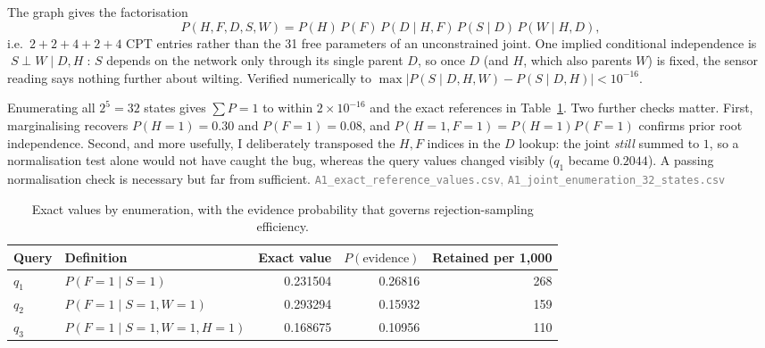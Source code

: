 \documentclass[10pt,a4paper]{article}
\begin{document}
\begin{minipage}[t]{0.30\textwidth}
\vspace{2pt}
\centering
{}
\end{minipage}%
\begin{minipage}[t]{0.68\textwidth}
\vspace{4pt}
The graph gives the factorisation
\[
P(H,F,D,S,W)=P(H)\,P(F)\,P(D\mid H,F)\,P(S\mid D)\,P(W\mid H,D),
\]
i.e.\ $2{+}2{+}4{+}2{+}4$ CPT entries rather than the 31 free parameters of an unconstrained joint.
One implied conditional independence is $\;S \perp W \mid D,H\;$: $S$ depends on the network only
through its single parent $D$, so once $D$ (and $H$, which also parents $W$) is fixed, the sensor
reading says nothing further about wilting. Verified numerically to
$\max|P(S\mid D,H,W)-P(S\mid D,H)| < 10^{-16}$.
\end{minipage}

\smallskip
Enumerating all $2^5=32$ states gives $\sum P = 1$ to within $2\times10^{-16}$ and the exact
references in Table~\ref{tab:Aexact}. Two further checks matter. First, marginalising recovers
$P(H{=}1)=0.30$ and $P(F{=}1)=0.08$, and $P(H{=}1,F{=}1)=P(H{=}1)P(F{=}1)$ confirms prior root
independence. Second, and more usefully, I deliberately transposed the $H,F$ indices in the $D$
lookup: the joint \emph{still} summed to $1$, so a normalisation test alone would not have caught
the bug, whereas the query values changed visibly ($q_1$ became $0.2044$). A passing normalisation
check is necessary but far from sufficient.
\textcolor{gray}{\small\texttt{A1\_exact\_reference\_values.csv}, \texttt{A1\_joint\_enumeration\_32\_states.csv}}

\begin{table}[H]\centering\small
\caption{Exact values by enumeration, with the evidence probability that governs rejection-sampling efficiency.}
\label{tab:Aexact}
\begin{tabular}{llrrr}
\toprule
Query & Definition & Exact value & $P(\text{evidence})$ & Retained per 1{,}000 \\
\midrule
$q_1$ & $P(F{=}1\mid S{=}1)$ & 0.231504 & 0.26816 & 268 \\
$q_2$ & $P(F{=}1\mid S{=}1,W{=}1)$ & 0.293294 & 0.15932 & 159 \\
$q_3$ & $P(F{=}1\mid S{=}1,W{=}1,H{=}1)$ & 0.168675 & 0.10956 & 110 \\
\bottomrule
\end{tabular}
\end{table}
\end{document}
